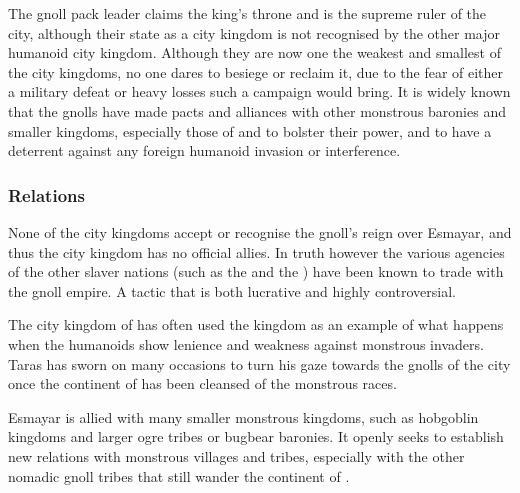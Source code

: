 The gnoll pack leader claims the king's throne and is the supreme ruler of the
city, although their state as a city kingdom is not recognised by the other
major humanoid city kingdom. Although they are now one the weakest and
smallest of the city kingdoms, no one dares to besiege or reclaim it, due to
the fear of either a military defeat or heavy losses such a campaign would
bring. It is widely known that the gnolls have made pacts and alliances with
other monstrous baronies and smaller kingdoms, especially those of
 and  to bolster their power,
and to have a deterrent against any foreign humanoid invasion or interference.

\subsubsection{Relations}


None of the city kingdoms accept or recognise the gnoll's reign over Esmayar,
and thus the city kingdom has no official allies. In truth however the various
agencies of the other slaver nations (such as the 
and the ) have been known to trade with the gnoll
empire. A tactic that is both lucrative and highly controversial.

The city kingdom of  has often used the kingdom as an
example of what happens when the humanoids show lenience and weakness against
monstrous invaders. Taras has sworn on many occasions to turn his gaze towards
the gnolls of the city once the continent of  has been
cleansed of the monstrous races.

Esmayar is allied with many smaller monstrous kingdoms, such as hobgoblin
kingdoms and larger ogre tribes or bugbear baronies. It openly seeks to
establish new relations with monstrous villages and tribes, especially with
the other nomadic gnoll tribes that still wander the continent of
.
